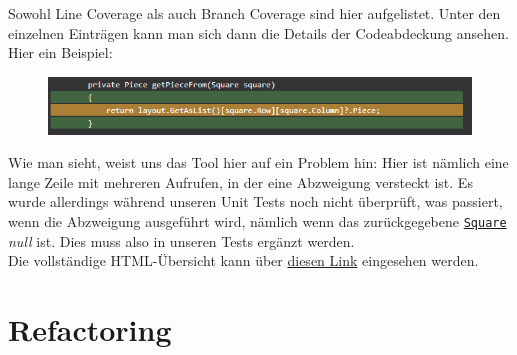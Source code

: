 \documentclass[
10pt, %
a4paper, %
oneside, %
headinclude,footinclude, %
BCOR5mm, %
]{scrartcl}
\begin{document}
\begin{onehalfspace}
Sowohl Line Coverage als auch Branch Coverage sind hier aufgelistet. Unter den einzelnen Einträgen kann man sich dann die Details der Codeabdeckung ansehen.
Hier ein Beispiel:
\begin{figure}[ht!]
	\includegraphics[width=\linewidth]{methodcovered}
\end{figure}

Wie man sieht, weist uns das Tool hier auf ein Problem hin: Hier ist nämlich eine lange Zeile mit mehreren Aufrufen, in der eine Abzweigung versteckt ist. Es wurde allerdings während unseren Unit Tests noch nicht überprüft, was passiert, wenn die Abzweigung ausgeführt wird, nämlich wenn das zurückgegebene \texttt{\href{https://github.com/schmida736/Chess-AdvancedSE/blob/main/Chess-AdvancedSE/Game\%20Elements/Square.cs}{Square}} \textsl{null} ist. Dies muss also in unseren Tests ergänzt werden.
\\
Die vollständige HTML-Übersicht kann über \href{https://github.com/schmida736/Chess-AdvancedSE/tree/main/Chess-AdvancedSE.Tests/coverage%20results}{diesen Link} eingesehen werden.

\newpage
\section{Refactoring}

\end{onehalfspace}
\end{document}

